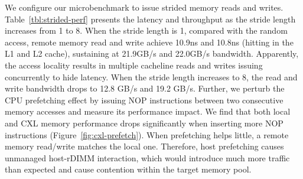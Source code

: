 We configure our microbenchmark to issue strided memory reads and writes. Table~\ref{tbl:strided-perf} presents the latency and throughput as the stride length increases from 1 to 8. When the stride length is 1, compared with the random access, remote memory read and write achieve 10.9ns and 10.8ns (hitting in the L1 and L2 cache), sustaining at 21.9GB/s and 22.0GB/s bandwidth. Apparently, the access locality results in multiple cacheline reads and writes issuing concurrently to hide latency. When the stride length increases to 8, the read and write bandwidth drops to 12.8 GB/s and 19.2 GB/s. Further, we perturb the CPU prefetching effect by issuing NOP instructions between two consecutive memory accesses and measure its performance impact. We find that both local and CXL memory performance drops significantly when inserting more NOP instructions (Figure~\ref{fig:cxl-prefetch}). When prefetching helps little, a remote memory read/write matches the local one. Therefore, host prefetching causes unmanaged host-rDIMM interaction, which would introduce much more traffic than expected and cause contention within the target memory pool.





